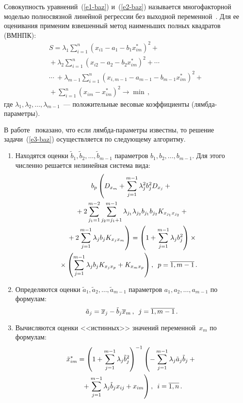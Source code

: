 \begin{multicols}{2}
  Совокупность уравнений~(\ref{e1-baz}) и~(\ref{e2-baz}) называется 
многофакторной моделью полносвязной линейной регрессии без выходной 
переменной~\cite{10-baz}.
  Для ее оценивания применим взвешенный метод наименьших полных 
квадратов (ВМНПК):
  \begin{multline}
  S=\lambda_1\sum\limits^n_{i=1} \left( x_{i1}-a_1-b_1x^*_{im}\right)^2 
+{}\\
{}+
\lambda_2\sum\limits^n_{i=1} \left( x_{i2}-a_2-b_2x^*_{im}\right)^2+\cdots {}\\
  {}\cdots\ +\lambda_{m-1}\sum\limits^n_{i=1}\left( x_{i,m-1}-a_{m-1}-b_{m-1} 
x^*_{im}\right)^2+{}\\
{}+\sum\limits^n_{i=1} \left( x_{im} -x^*_{im}\right)^2\to \min\,,
  \label{e3-baz}
  \end{multline}
где $\lambda_1, \lambda_2,\ldots , \lambda_{m-1}$~--- положительные весовые 
коэффициенты (лямбда-параметры).
  
  В работе~\cite{10-baz} показано, что если лямб\-да-па\-ра\-мет\-ры известны, то 
решение задачи~(\ref{e3-baz}) осуществляется по следующему алгоритму.
  \begin{enumerate}[1.]
\item Находятся оценки $\tilde{b}_1, \tilde{b}_2,\ldots , \tilde{b}_{m-1}$ 
параметров $b_1, b_2, \ldots, b_{m-1}$. Для этого численно решается нелинейная 
система вида:
\begin{multline} 
b_p\left( D_{x_m}+\sum\limits_{j=1}^{m-1} \lambda^2_j b_j^2 
D_{x_j} +{}\right.\\
{}+2\sum\limits^{m-2}_{j_1=1} \sum\limits^{m-1}_{j_2=j_1+1} 
\lambda_{j_1} \lambda_{j_2} b_{j_1}b_{j_2} 
K_{x_{j_1}x_{j_2}}+{}\\
\left.{}+2\sum\limits_{j=1}^{m-1} \lambda_j b_j 
K_{x_jx_m}\right)= \left( 1+\sum\limits_{j=1}^{m-1} \lambda_j b_j^2\right)\times{}\\
\hspace*{-5mm}{}\times \left( 
\sum\limits_{j=1}^{m-1} \lambda_j b_j K_{x_jx_p}+K_{x_mx_p}\right),\enskip 
  p=\overline{1,m-1}\,.\!\!
  \label{e4-baz}
  \end{multline}
\item Определяются оценки $\tilde{a}_1, \tilde{a}_2, \ldots , \tilde{a}_{m-1}$ 
па\-ра\-мет\-ров $a_1, a_2, \ldots , a_{m-1}$ по формулам:
\begin{equation}
\tilde{a}_j= \overline{x}_j -\tilde{b}_j \overline{x}_m\,,\enskip j\hm=\overline{1,m-
1}\,.
\label{e5-baz}
\end{equation}
\item Вычисляются оценки <<истинных>> значений переменной~$x_m$ по 
формулам:
\begin{multline}
\tilde{x}_{im}^* =\left( 1+\sum\limits^{m-1}_{j=1} \lambda_j \tilde{b}_j^2\right)^{-
1} \left( -\sum\limits_{j=1}^{m-1} \lambda_j \tilde{a}_j \tilde{b}_j 
+{}\right.\\
\left.{}+\sum\limits_{j=1}^{m-1} \lambda_j \tilde{b}_j x_{ij} +x_{im}\right),\enskip
i=\overline{1,n}\,.
\label{e6-baz}
\end{multline}
  \end{enumerate}
  

\end{multicols}
